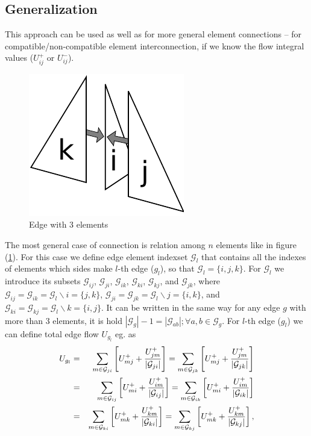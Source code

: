  \subsection{Generalization}
  This approach can be used as well as for more general element connections -- for compatible/non-compatible element interconnection, if we know the flow integral
  values ($U_{ij}^{+}$ or $U_{ij}^{-}$). %
      \begin{figure}[h]
        \begin{center}
        \includegraphics[scale=0.7]{obr7.pdf} 
	\caption{Edge with 3 elements}
	\label{edgemodel}
        \end{center}
      \end{figure}  
  The most general case of connection is relation among $n$ elements like in figure (\ref{edgemodel}). For this case we define
edge element indexset $\mathcal{G}_{l}$ that contains all the indexes of elements which sides make $l$-th edge ($g_l$), so that $\mathcal{G}_{l} = \{i,j,k\}$.
For $\mathcal{G}_{l}$ we introduce its subsets $\mathcal{G}_{ij}$, $\mathcal{G}_{ji}$, $\mathcal{G}_{ik}$, $\mathcal{G}_{ki}$, $\mathcal{G}_{kj}$, and $\mathcal{G}_{jk}$,
  where $\mathcal{G}_{ij} = \mathcal{G}_{ik} =  \mathcal{G}_{l} \backslash {i} = \{j,k\}$, $ \mathcal{G}_{ji} = \mathcal{G}_{jk} = \mathcal{G}_{l} \backslash {j} =\{i,k\}$, and
 $\mathcal{G}_{ki} = \mathcal{G}_{kj} = \mathcal{G}_{l} \backslash {k} =\{i,j\}$. It can be written in the same way for any edge $g$ with more than 3 elements, 
it is hold  $|\mathcal{G}_{g}| - 1 = |\mathcal{G}_{ab}|; \forall a,b \in \mathcal{G}_{g}$.
For $l$-th edge ($g_l$) we can define total edge flow $U_{g_{l}}$ eg. as
  \begin{eqnarray}
   U_{g_{l}} &=& \sum\limits_{m \in \mathcal{G}_{ji}}   \left[ U_{mj}^{+}   + \frac{ U_{jm}^{+}}{|\mathcal{G}_{ji}|} \right] = \sum\limits_{m \in \mathcal{G}_{jk}}  \left[ U_{mj}^{+}   +  \frac{ U_{jm}^{+}}{|\mathcal{G}_{jk}|} \right] \notag \\
	      &=& \sum\limits_{m \in \mathcal{G}_{ij}}  \left[ U_{mi}^{+}   +  \frac{ U_{im}^{+}}{|\mathcal{G}_{ij}|} \right] = \sum\limits_{m \in \mathcal{G}_{ik}} \left[  U_{mi}^{+} +  \frac{ U_{im}^{+}}{|\mathcal{G}_{ik}|} \right] \notag \\ 
	      &=& \sum\limits_{m \in \mathcal{G}_{ki}}  \left[ U_{mk}^{+}   +  \frac{ U_{km}^{+}}{|\mathcal{G}_{ki}|} \right] = \sum\limits_{m \in \mathcal{G}_{kj}}  \left[ U_{mk}^{+}   +  \frac{ U_{km}^{+}}{|\mathcal{G}_{kj}|} \right], \label{edgeflow}
  \end{eqnarray}
